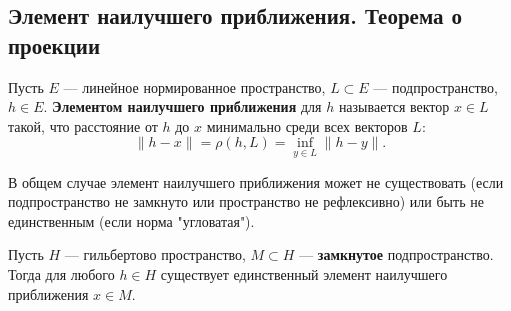 
\subsection{Элемент наилучшего приближения. Теорема о проекции}

\begin{definition}
	Пусть $E$ --- линейное нормированное пространство, $L \subset E$ --- подпространство, $h \in E$. \textbf{Элементом наилучшего приближения} для $h$ называется вектор $x \in L$ такой, что расстояние от $h$ до $x$ минимально среди всех векторов $L$:
	\[ \|h - x\| = \rho(h, L) = \inf \limits_{y \in L} \|h - y\|. \]
\end{definition}

\begin{remark}
	В общем случае элемент наилучшего приближения может не существовать (если подпространство не замкнуто или пространство не рефлексивно) или быть не единственным (если норма "угловатая").
\end{remark}

\begin{proposition}\label{bestelt}
	Пусть $H$ --- гильбертово пространство, $M \subset H$ --- \textbf{замкнутое} подпространство. Тогда для любого $h \in H$ существует единственный элемент наилучшего приближения $x \in M$.
\end{proposition}

